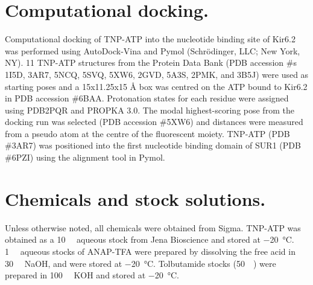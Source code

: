 \section{Computational docking.}
Computational docking of TNP-ATP into the nucleotide binding site of Kir6.2 was performed using AutoDock-Vina and Pymol (Schrödinger, LLC; New York, NY).
11 TNP-ATP structures from the Protein Data Bank (PDB accession \#s 1I5D, 3AR7, 5NCQ, 5SVQ, 5XW6, 2GVD, 5A3S, 2PMK, and 3B5J) were used as starting poses and a 15x11.25x15 \si{\angstrom} box was centred on the ATP bound to Kir6.2 in PDB accession \#6BAA.
Protonation states for each residue were assigned using PDB2PQR and PROPKA 3.0.
The modal highest-scoring pose from the docking run was selected (PDB accession \#5XW6) and distances were measured from a pseudo atom at the centre of the fluorescent moiety.
TNP-ATP (PDB \#3AR7) was positioned into the first nucleotide binding domain of SUR1 (PDB \#6PZI) using the alignment tool in Pymol.

\section{Chemicals and stock solutions.}
Unless otherwise noted, all chemicals were obtained from Sigma.
TNP-ATP was obtained as a \SI{10}{\milli\Molar} aqueous stock from Jena Bioscience and stored at \SI{-20}{\degreeCelsius}. \SI{1}{\milli\Molar} aqueous stocks of ANAP-TFA were prepared by dissolving the free acid in \SI{30}{\milli\Molar} NaOH, and were stored at \SI{-20}{\degreeCelsius}. Tolbutamide stocks (\SI{50}{\milli\Molar}) were prepared in \SI{100}{\milli\Molar} KOH and stored at \SI{-20}{\degreeCelsius}.

